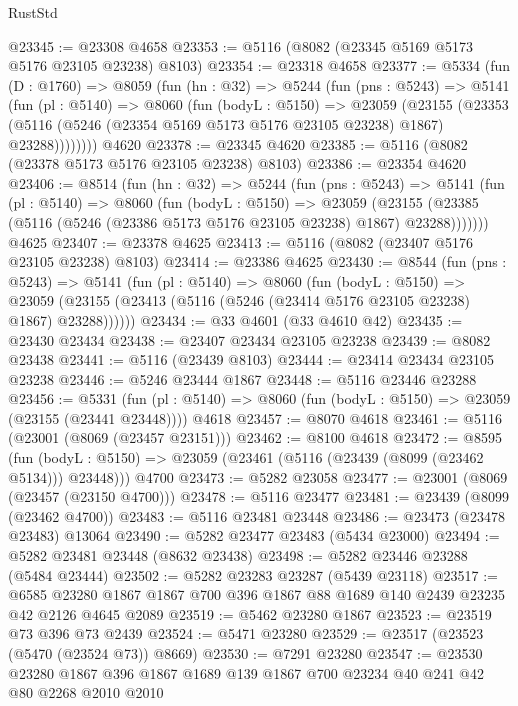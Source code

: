 \begin{lexlean}{RustStd}
\begin{coremodule}
{\begin{coremodule}
{{{{{{{{{{{{{{{{{{{{{{{{{{{{{{{@23345 := @23308 @4658
@23353 := @5116 (@8082 (@23345 @5169 @5173 @5176 @23105 @23238) @8103)
@23354 := @23318 @4658
@23377 := @5334
    (fun (D : @1760) =>
    @8059
      (fun (hn : @32) =>
      @5244
        (fun (pns : @5243) =>
        @5141
          (fun (pl : @5140) =>
          @8060
            (fun (bodyL : @5150) =>
            @23059
              (@23155
                (@23353 (@5116 (@5246 (@23354 @5169 @5173 @5176 @23105 @23238) @1867) @23288))))))))
    @4620
@23378 := @23345 @4620
@23385 := @5116 (@8082 (@23378 @5173 @5176 @23105 @23238) @8103)
@23386 := @23354 @4620
@23406 := @8514
    (fun (hn : @32) =>
    @5244
      (fun (pns : @5243) =>
      @5141
        (fun (pl : @5140) =>
        @8060
          (fun (bodyL : @5150) =>
          @23059
            (@23155 (@23385 (@5116 (@5246 (@23386 @5173 @5176 @23105 @23238) @1867) @23288)))))))
    @4625
@23407 := @23378 @4625
@23413 := @5116 (@8082 (@23407 @5176 @23105 @23238) @8103)
@23414 := @23386 @4625
@23430 := @8544
    (fun (pns : @5243) =>
    @5141
      (fun (pl : @5140) =>
      @8060
        (fun (bodyL : @5150) =>
        @23059 (@23155 (@23413 (@5116 (@5246 (@23414 @5176 @23105 @23238) @1867) @23288))))))
@23434 := @33 @4601 (@33 @4610 @42)
@23435 := @23430 @23434
@23438 := @23407 @23434 @23105 @23238
@23439 := @8082 @23438
@23441 := @5116 (@23439 @8103)
@23444 := @23414 @23434 @23105 @23238
@23446 := @5246 @23444 @1867
@23448 := @5116 @23446 @23288
@23456 := @5331
    (fun (pl : @5140) => @8060 (fun (bodyL : @5150) => @23059 (@23155 (@23441 @23448))))
    @4618
@23457 := @8070 @4618
@23461 := @5116 (@23001 (@8069 (@23457 @23151)))
@23462 := @8100 @4618
@23472 := @8595
    (fun (bodyL : @5150) => @23059 (@23461 (@5116 (@23439 (@8099 (@23462 @5134))) @23448)))
    @4700
@23473 := @5282 @23058
@23477 := @23001 (@8069 (@23457 (@23150 @4700)))
@23478 := @5116 @23477
@23481 := @23439 (@8099 (@23462 @4700))
@23483 := @5116 @23481 @23448
@23486 := @23473 (@23478 @23483) @13064
@23490 := @5282 @23477 @23483 (@5434 @23000)
@23494 := @5282 @23481 @23448 (@8632 @23438)
@23498 := @5282 @23446 @23288 (@5484 @23444)
@23502 := @5282 @23283 @23287 (@5439 @23118)
@23517 := @6585 @23280 @1867 @1867 @700 @396 @1867 @88 @1689 @140 @2439 @23235 @42 @2126 @4645 @2089
@23519 := @5462 @23280 @1867
@23523 := @23519 @73 @396 @73 @2439
@23524 := @5471 @23280
@23529 := @23517 (@23523 (@5470 (@23524 @73)) @8669)
@23530 := @7291 @23280
@23547 := @23530
    @23280
    @1867
    @396
    @1867
    @1689
    @139
    @1867
    @700
    @23234
    @40
    @241
    @42
    @80
    @2268
    @2010
    @2010
}}}}}}}}}}}}}}}}}}}}}}}}}}}}}}}
\end{coremodule}}
\end{coremodule}
\end{lexlean}
